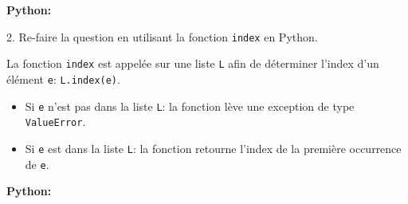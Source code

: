 \begin{Exercice}[20 minutes] [Python]
        
    \begin{solution}
    \textbf{Python:}
    
    \end{solution}

    2. Re-faire la question en utilisant la fonction \lstinline{index} en Python.

    \begin{conseil}
        La fonction \lstinline|index| est appelée sur une liste \texttt{L} afin de déterminer l'index d'un élément \texttt{e}: \lstinline{L.index(e)}.
        \begin{itemize}
            \item Si \texttt{e} n'est pas dans la liste \texttt{L}: la fonction lève une exception de type \lstinline{ValueError}. 
            \item Si \texttt{e} est dans la liste \texttt{L}: la fonction retourne l'index de la première occurrence de \texttt{e}.
        \end{itemize}
    \end{conseil}

    \begin{solution}
        \textbf{Python:}
        
    \end{solution}
    \begin{solution}
        
    \end{solution}
    
    \end{Exercice}
    
